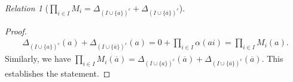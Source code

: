 \documentclass[12pt]{amsart}
\theoremstyle{remark}
\newtheorem{relation}{Relation}
\numberwithin{equation}{section}
\begin{document}
\begin{relation}[$\prod_{i\in I}M_{i}=\Delta_{(I\cup \{a\})^{c}}+\Delta_{(I\cup \{\overline{a}\})^{c}}$]
\begin{proof}
\begin{align*}
\Delta_{(I\cup \{a\})^{c}}(a)+\Delta_{(I\cup \{\overline{a}\})^{c}}(a)=0+\prod_{i\in I}\alpha(ai)=\prod_{i\in I} M_{i}(a). %
\end{align*}
Similarly, we have $\prod_{i\in I} M_{i}(\overline{a})=\Delta_{(I\cup \{a\})^{c}}(\overline{a})+\Delta_{(I\cup \{\overline{a}\})^{c}}(\overline{a})$.
This establishes the statement.
\end{proof}
\end{relation}
\end{document}
